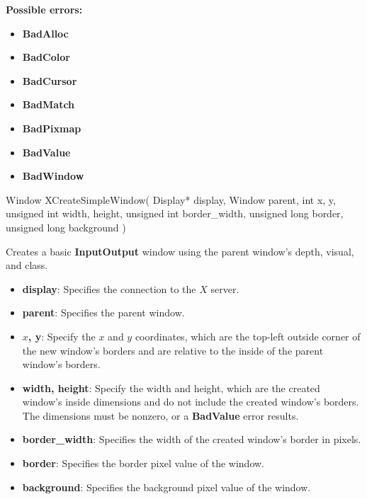 \documentclass{report}
\begin{document}
\begin{itemize}
            \bigbreak \noindent
            \textbf{Possible errors:}
            \begin{itemize}
                \item \textbf{BadAlloc}
                \item \textbf{BadColor}
                \item \textbf{BadCursor}
                \item \textbf{BadMatch}
                \item \textbf{BadPixmap}
                \item \textbf{BadValue}
                \item \textbf{BadWindow}
            \end{itemize}

            \begin{cppcode}
                Window XCreateSimpleWindow(
                    Display* display,
                    Window parent, 
                    int x, y,
                    unsigned int width, height,
                    unsigned int border_width,
                    unsigned long border,
                    unsigned long background
                )
            \end{cppcode}
            \bigbreak \noindent
            Creates a basic \textbf{InputOutput} window using the parent window's depth, visual, and class.

            \begin{itemize}
                \item \textbf{display}: Specifies the connection to the $X$ server.
                \item \textbf{parent}: Specifies the parent window.
                \item \textbf{$x$, y}: Specify the $x$ and $y$ coordinates, which are the top-left outside corner of the new window’s borders and are relative to the inside of the parent window’s borders.
                \item \textbf{width, height}: Specify the width and height, which are the created window’s inside dimensions and do not include the created window’s borders. The dimensions must be nonzero, or a \textbf{BadValue} error results.
                \item \textbf{border\_width}: Specifies the width of the created window’s border in pixels.
                \item \textbf{border}: Specifies the border pixel value of the window.
                \item \textbf{background}: Specifies the background pixel value of the window.
            \end{itemize}


\end{itemize}
\end{document}
